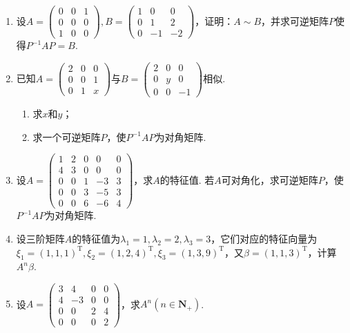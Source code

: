 \begin{enumerate}
    \item 设$A=\begin{pmatrix}
                  0 & 0 & 1 \\ 0 & 0 & 0 \\ 1 & 0 & 0
              \end{pmatrix},B=\begin{pmatrix}
                  1 & 0 & 0 \\ 0 & 1 & 2 \\ 0 & -1 & -2
              \end{pmatrix}$，证明：$A\sim B$，并求可逆矩阵$P$使得$P^{-1}AP=B$.

    \item 已知$A=\begin{pmatrix}
                  2 & 0 & 0 \\ 0 & 0 & 1 \\ 0 & 1 & x
              \end{pmatrix}$与$B=\begin{pmatrix}
                  2 & 0 & 0 \\ 0 & y & 0 \\ 0 & 0 & -1
              \end{pmatrix}$相似.
          \begin{enumerate}
              \item 求$x$和$y$；

              \item 求一个可逆矩阵$P$，使$P^{-1}AP$为对角矩阵.
          \end{enumerate}

    \item 设$A=\begin{pmatrix}
                  1 & 2 & 0 & 0  & 0 \\ 4 & 3 & 0 & 0 & 0 \\ 0 & 0 & 1 & -3 & 3 \\ 0 & 0 & 3 & -5 & 3 \\
                  0 & 0 & 6 & -6 & 4
              \end{pmatrix}$，求$A$的特征值. 若$A$可对角化，求可逆矩阵$P$，使$P^{-1}AP$为对角矩阵.

    \item 设三阶矩阵$A$的特征值为$\lambda_1=1,\lambda_2=2,\lambda_3=3$，它们对应的特征向量为$\xi_1=(1,1,1)^\mathrm{T}, \xi_2=(1,2,4)^\mathrm{T},\xi_3=(1,3,9)^\mathrm{T}$，又$\beta=(1,1,3)^\mathrm{T}$，计算$A^n\beta$.

    \item 设$A=\begin{pmatrix}
                  3 & 4 & 0 & 0 \\ 4 & -3 & 0 & 0 \\ 0 & 0 & 2 & 4 \\ 0 & 0 & 0 & 2
              \end{pmatrix}$，求$A^n(n\in\mathbf{N}_+)$.


\end{enumerate}

